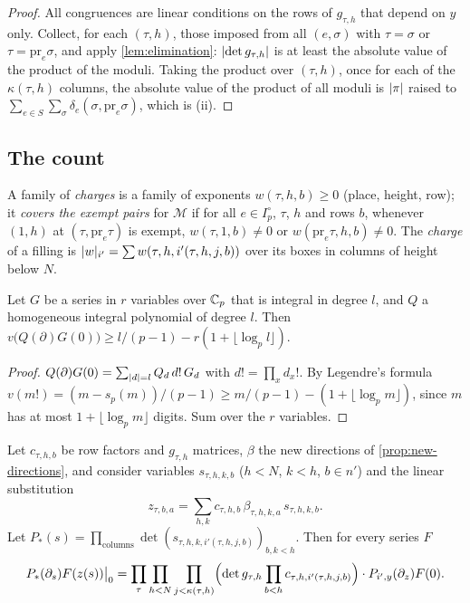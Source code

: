 \begin{proof}
All congruences are linear conditions on the rows of $g_{\tau,h}$ that depend on $y$ only. Collect, for
each $(\tau,h)$, those imposed from all $(e,\sigma)$ with $\tau=\sigma$ or $\tau=\mathrm{pr}_e\sigma$,
and apply \cref{lem:elimination}: $\lvert \det g_{\tau,h}\rvert$ is at least the absolute value of the
product of the moduli. Taking the product over $(\tau,h)$, once for each of the $\kappa(\tau,h)$
columns, the absolute value of the product of all moduli is $\lvert \pi\rvert$ raised to
$\sum_{e\in S}\sum_\sigma\delta_e(\sigma,\mathrm{pr}_e\sigma)$, which is (ii).
\end{proof}

\subsection{The count}\label{ss:count}
A family of \emph{charges} is a family of exponents $w(\tau,h,b)\ge0$ (place, height, row); it
\emph{covers the exempt pairs} for $\mathcal M$ if for all $e\in I_p^\circ$, $\tau$, $h$ and rows $b$,
whenever $(1,h)$ at $(\tau,\mathrm{pr}_e\tau)$ is exempt, $w(\tau,1,b)\ne0$ or
$w(\mathrm{pr}_e\tau,h,b)\ne0$. The \emph{charge} of a filling is
$\lvert w\rvert_{i'}=\sum w(\tau,h,i'(\tau,h,j,b))$ over its boxes in columns of height below $N$.

\begin{lemma}\label{lem:legendre}
Let $G$ be a series in $r$ variables over $\mathbb{C}_p$ that is integral in degree $l$, and $Q$ a homogeneous
integral polynomial of degree $l$. Then $v\bigl(Q(\partial)G(0)\bigr)\ge l/(p-1)-r(1+\lfloor\log_pl
\rfloor)$.
\end{lemma}

\begin{proof}
$Q(\partial)G(0)=\sum_{\lvert d\rvert=l}Q_d\,d!\,G_d$ with $d!=\prod_xd_x!$. By Legendre's formula
$v(m!)=(m-s_p(m))/(p-1)\ge m/(p-1)-(1+\lfloor\log_pm\rfloor)$, since $m$ has at most
$1+\lfloor\log_pm\rfloor$ digits. Sum over the $r$ variables.
\end{proof}

\begin{lemma}\label{lem:chain-rule}
Let $c_{\tau,h,b}$ be row factors and $g_{\tau,h}$ matrices, $\beta$ the new directions of
\cref{prop:new-directions}, and consider variables $s_{\tau,h,k,b}$ ($h<N$, $k<h$, $b\in n'$) and the
linear substitution
\[
  z_{\tau,b,a}=\sum_{h,k}c_{\tau,h,b}\,\beta_{\tau,h,k,a}\,s_{\tau,h,k,b}.
\]
Let $P_*(s)=\prod_{\text{columns}}\det(s_{\tau,h,k,i'(\tau,h,j,b)})_{b,k<h}$. Then for every series $F$
\[
  P_*(\partial_s)F(z(s))\big|_0=\prod_\tau\prod_{h<N}\prod_{j<\kappa(\tau,h)}
  \Bigl(\det g_{\tau,h}\prod_{b<h}c_{\tau,h,i'(\tau,h,j,b)}\Bigr)\cdot P_{i',y}(\partial_z)F(0).
\]
\end{lemma}

